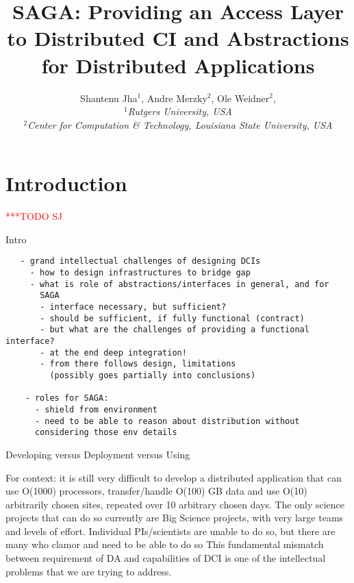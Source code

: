\documentclass[a4paper,10pt]{article}
\newcommand{\todo}[1]{     {\textcolor{red}  { ***TODO      #1 }}}
\newcommand{\todo}[1]{}
\begin{document}
 \title{ \large \vspace{-3.5em} SAGA: Providing an Access Layer to
   Distributed CI and Abstractions for Distributed Applications}


 \author{\normalsize Shantenu Jha$^{1}$, Andre Merzky$^{2}$, Ole
   Weidner$^{2}$, \\ \small{\emph{$^{1}$Rutgers University,
       USA}}\\ \small{\emph{$^{2}$Center for Computation \&
       Technology, Louisiana State University, USA}}\\ } \date{}
 \maketitle

 
\section{Introduction}
 \todo{SJ}
 \label{intro}

  Intro

 \begin{verbatim}
   - grand intellectual challenges of designing DCIs
     - how to design infrastructures to bridge gap
     - what is role of abstractions/interfaces in general, and for
       SAGA
       - interface necessary, but sufficient?
       - should be sufficient, if fully functional (contract)
       - but what are the challenges of providing a functional interface?
       - at the end deep integration!
       - from there follows design, limitations
         (possibly goes partially into conclusions)

    - roles for SAGA: 
      - shield from environment
      - need to be able to reason about distribution without
      considering those env details

 \end{verbatim}

Developing versus Deployment versus Using

For context: it is still very difficult to develop a distributed
application that can use O(1000) processors, transfer/handle O(100) GB
data and use O(10) arbitrarily chosen sites, repeated over 10
arbitrary chosen days. The only science projects that can do so
currently are Big Science projects, with very large teams and levels
of effort.  Individual PIs/scientists are unable to do so, but there
are many who clamor and need to be able to do so This fundamental
mismatch between requirement of DA and capabilities of DCI is one of
the intellectual problems that we are trying to address.
\end{document}
